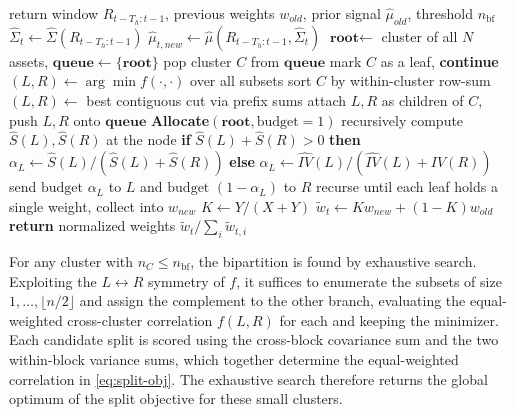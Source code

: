 \documentclass[12pt]{article}
\begin{document}
\vspace{0.5 cm}

\begin{algorithmic}[1]
\toprule
\REQUIRE return window $R_{t-T_h:t-1}$, previous weights $w_{old}$, prior signal $\hat{\mu}_{old}$, threshold $n_{\text{bf}}$
\midrule
\STATE $\hat{\Sigma}_t \gets \hat{\Sigma}(R_{t-T_h:t-1})$ \hfill \COMMENT{(\ref{eq:nls-cov})}
\STATE $\hat{\mu}_{t,new}\gets \hat{\mu}(R_{t-T_h:t-1},\hat{\Sigma}_t)$ \hfill \COMMENT{(\ref{eq:BL_simplified})}
\STATE $\textbf{root} \gets$ cluster of all $N$ assets, $\textbf{queue} \gets \{\textbf{root}\}$
    \STATE pop cluster $C$ from $\textbf{queue}$
        \STATE mark $C$ as a leaf, \textbf{continue}
    \ENDIF
        \STATE $(L,R) \gets \arg\min f(\cdot,\cdot)$ over all subsets \hfill {}
    \ELSE
        \STATE sort $C$ by within-cluster row-sum
        \STATE $(L,R) \gets$ best contiguous cut via prefix sums \hfill {}
    \ENDIF
    \STATE attach $L,R$ as children of $C$, push $L,R$ onto $\textbf{queue}$
\ENDWHILE
\STATE \textbf{Allocate}$(\textbf{root},\text{budget}=1)$ recursively
\STATE \quad compute $\hat{S}(L),\hat{S}(R)$ at the node \hfill \COMMENT{(\ref{eq:sharpe-proxy})}
\STATE \quad \textbf{if} $\hat{S}(L)+\hat{S}(R)>0$ \textbf{ then } $\alpha_L \gets \hat{S}(L)/(\hat{S}(L)+\hat{S}(R))$
\STATE \quad \textbf{else } $\alpha_L \gets \widehat{IV}(L)/(\widehat{IV}(L)+\widehat{IV}(R))$ \hfill \COMMENT{(\ref{eq:inv_var})}
\STATE \quad send $\text{budget } \alpha_L$ to $L$ and $\text{budget }(1-\alpha_L)$ to $R$
\STATE \quad recurse until each leaf holds a single weight, collect into $w_{new}$
\STATE $K \gets Y/(X+Y)$
\STATE $\tilde{w}_t \gets K w_{new} + (1-K)w_{old}$
\STATE \textbf{return} normalized weights $\tilde{w}_t / \sum_i \tilde{w}_{t,i}$
\end{algorithmic}
\bottomrule

\vspace{0.5 cm}

For any cluster with $n_C\le n_{\text{bf}}$, the bipartition is found by exhaustive search. Exploiting the $L\!\leftrightarrow\!R$ symmetry of $f$, it suffices to enumerate the subsets of size $1,\dots,\lfloor n/2\rfloor$ and assign the complement to the other branch, evaluating the equal-weighted cross-cluster correlation $f(L,R)$ for each and keeping the minimizer. Each candidate split is scored using the cross-block covariance sum and the two within-block variance sums, which together determine the equal-weighted correlation in \eqref{eq:split-obj}. The exhaustive search therefore returns the global optimum of the split objective for these small clusters.
\end{document}
